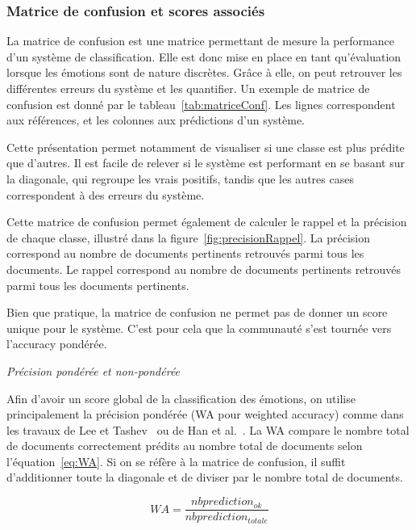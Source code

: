 \subsubsection{Matrice de confusion et scores associés}
La matrice de confusion est une matrice permettant de mesure la performance d'un système de classification. Elle est donc mise en place en tant qu'évaluation lorsque les émotions sont de nature discrètes. Grâce à elle, on peut retrouver les différentes erreurs du système et les quantifier. Un exemple de matrice de confusion est donné par le tableau~\ref{tab:matriceConf}. Les lignes correspondent aux références, et les colonnes aux prédictions d'un système.




Cette présentation permet notamment de visualiser si une classe est plus prédite que d'autres. Il est facile de relever si le système est performant en se basant sur la diagonale, qui regroupe les vrais positifs, tandis que les autres cases correspondent à des erreurs du système.

Cette matrice de confusion permet également de calculer le rappel et la précision de chaque classe, illustré dans la figure~\ref{fig:precisionRappel}. La précision correspond au nombre de documents pertinents retrouvés parmi tous les documents. Le rappel correspond au nombre de documents pertinents retrouvés parmi tous les documents pertinents.

Bien que pratique, la matrice de confusion ne permet pas de donner un score unique pour le système. C'est pour cela que la communauté s'est tournée vers l'accuracy pondérée.

\vspace{1cm}
\textit{Précision pondérée et non-pondérée}

Afin d'avoir un score global de la classification des émotions, on utilise principalement la précision pondérée (WA pour weighted accuracy) comme dans les travaux de Lee et Tashev~\cite{Lee2015} ou de Han et al.~\cite{Han2014}.
La WA compare le nombre total de documents correctement prédits au nombre total de documents selon l'équation~\ref{eq:WA}. Si on se réfère à la matrice de confusion, il suffit d'additionner toute la diagonale et de diviser par le nombre total de documents.

\begin{equation}
  WA = \frac{nb  prediction_{ok}}{nb  prediction_{totale}}
  \label{eq:WA}
\end{equation}

